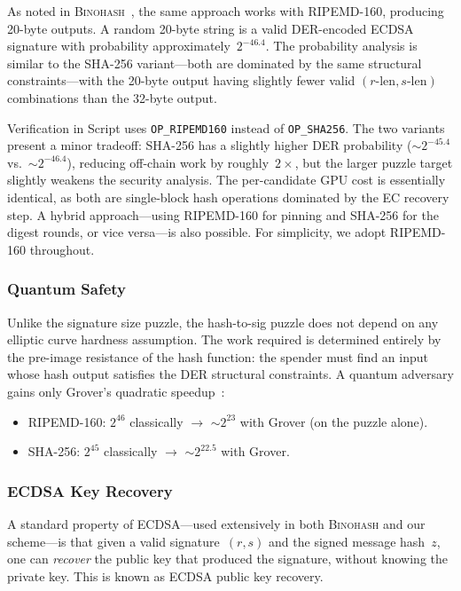 \documentclass[11pt, a4paper]{article}
\begin{document}
As noted in \textsc{Binohash}~\cite[Appendix~D]{linus2024binohash}, the same approach works with RIPEMD-160, producing 20-byte outputs. A random 20-byte string is a valid DER-encoded ECDSA signature with probability approximately~$2^{-46.4}$. The probability analysis is similar to the SHA-256 variant---both are dominated by the same structural constraints---with the 20-byte output having slightly fewer valid $(r\text{-len}, s\text{-len})$ combinations than the 32-byte output.

Verification in Script uses \texttt{OP\_RIPEMD160} instead of \texttt{OP\_SHA256}. The two variants present a minor tradeoff: SHA-256 has a slightly higher DER probability (${\sim}2^{-45.4}$ vs.~${\sim}2^{-46.4}$), reducing off-chain work by roughly~$2\times$, but the larger puzzle target slightly weakens the security analysis. The per-candidate GPU cost is essentially identical, as both are single-block hash operations dominated by the EC recovery step. A hybrid approach---using RIPEMD-160 for pinning and SHA-256 for the digest rounds, or vice versa---is also possible. For simplicity, we adopt RIPEMD-160 throughout.

\subsubsection{Quantum Safety}
\label{sec:hash-puzzle-qs}

Unlike the signature size puzzle, the hash-to-sig puzzle does not depend on any elliptic curve hardness assumption. The work required is determined entirely by the pre-image resistance of the hash function: the spender must find an input whose hash output satisfies the DER structural constraints. A quantum adversary gains only Grover's quadratic speedup~\cite{grover1996}:

\begin{itemize}
    \item RIPEMD-160: $2^{46}$ classically $\to$ ${\sim}2^{23}$ with Grover (on the puzzle alone).
    \item SHA-256: $2^{45}$ classically $\to$ ${\sim}2^{22.5}$ with Grover.
\end{itemize}

\subsubsection{ECDSA Key Recovery}
\label{sec:key-recovery}

A standard property of ECDSA---used extensively in both \textsc{Binohash} and our scheme---is that given a valid signature~$(r, s)$ and the signed message hash~$z$, one can \emph{recover} the public key that produced the signature, without knowing the private key. This is known as ECDSA public key recovery.
\end{document}
